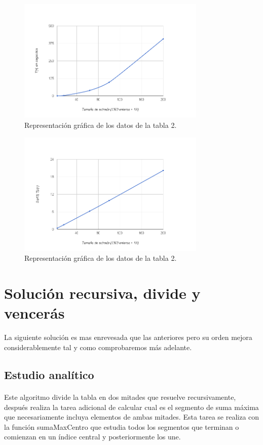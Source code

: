 \documentclass[es]{ifirak}
\begin{document}
\begin{figure}[htbp]
	\centering
	\includegraphics[width=0.8\textwidth]{cuadratica.png}
	\caption{Representación gráfica de los datos de la tabla 2.}\label{figure}
\end{figure}

\begin{figure}[htbp]
	\centering
	\includegraphics[width=0.8\textwidth]{raiz2.png}
	\caption{Representación gráfica de los datos de la tabla 2.}\label{figure}
\end{figure}
\newpage


\section{Solución recursiva, divide y vencerás}
La siguiente solución es mas enrevesada que las anteriores pero su orden mejora considerablemente tal y como comprobaremos más adelante.
\subsection{Estudio analítico}

\paragraph{}
Este algoritmo divide la tabla en dos mitades que resuelve recursivamente, después realiza la tarea adicional de calcular cual es el segmento de suma máxima que necesariamente incluya elementos de ambas mitades. Esta tarea se realiza con la función sumaMaxCentro que estudia todos los segmentos que terminan o comienzan en un índice central y posteriormente los une.
\end{document}
